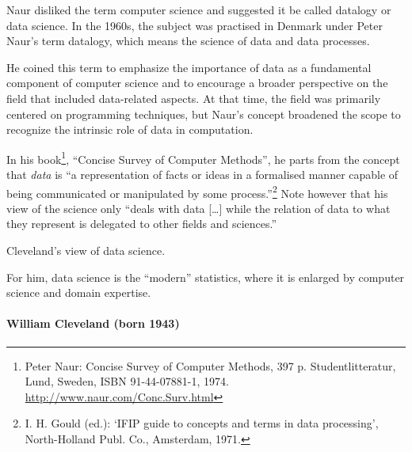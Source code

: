 Naur disliked the term computer science and suggested it be called datalogy or data
science.  In the 1960s, the subject was practised in Denmark under Peter
Naur's term datalogy, which means the science of data and data processes.

He coined this term to emphasize the importance of data as a fundamental component of
computer science and to encourage a broader perspective on the field that included
data-related aspects. At that time, the field was primarily centered on programming
techniques, but Naur's concept broadened the scope to recognize the intrinsic role of data
in computation.

In his book\footnote{Peter Naur: Concise Survey of Computer Methods, 397 p.
Studentlitteratur, Lund, Sweden, ISBN 91-44-07881-1, 1974.
\url{http://www.naur.com/Conc.Surv.html}}, ``Concise Survey of Computer Methods'', he
parts from the concept that \emph{data} is ``a representation of facts or ideas in a
formalised manner capable of being communicated or manipulated by some
process.''\footnote{I. H. Gould (ed.): ‘IFIP guide to concepts and terms in data
processing’, North-Holland Publ. Co., Amsterdam, 1971.} Note however that his view of the
science only ``deals with data [\dots] while the relation of data to what they represent
is delegated to other fields and sciences.''

\def\clevelandds{(0,0) circle (20mm)}
\def\clevelandst{(0:-5mm) circle (15mm)}
\def\clevelandde {(2,1) circle (15mm)}
\def\clevelandcs {(2,-1) circle (15mm)}

\begin{figurebox}[label=fig:cleveland]{Cleveland's view of data science.}
  \centering
  \tcblower
    For him, data science is the ``modern'' statistics,
    where it is enlarged by computer science and domain expertise.
\end{figurebox}

\paragraph{William Cleveland (born 1943)}

